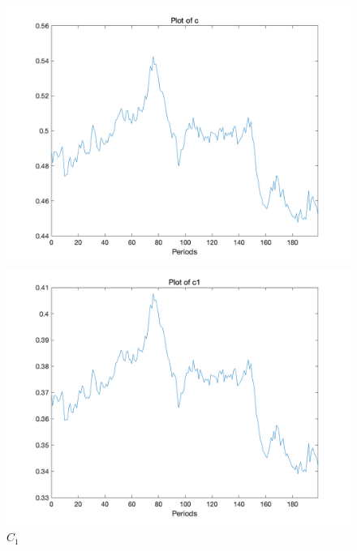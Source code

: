 \documentclass[a4paper,12pt]{ctexart}
\begin{document}
\begin{figure}[H]
    \begin{minipage}{0.48\linewidth}
        \includegraphics[width=\linewidth]{img/figure5.png}
        \caption{$C$}
    \end{minipage}
    \begin{minipage}{0.48\linewidth}
        \includegraphics[width=\linewidth]{img/figure6.png}
        \caption{$C_1$}
    \end{minipage}
\end{figure}
\end{document}
